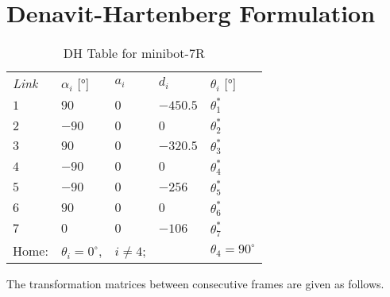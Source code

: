 \section{Denavit-Hartenberg Formulation}
\label{sec:dh}

{\renewcommand{\arraystretch}{1.2}
\begin{table}[t]
    \caption{DH Table for minibot-7R}
    \label{tab:dh}
    \centering
    \begin{tabular}{ *5l }           \toprule
      \emph{Link}  & \emph{$\alpha_i$} [\unit{\degree}]& \emph{$a_i$} & \emph{$d_i$}\; [\unit{\milli\meter}] & \emph{$\theta_i$} [\unit{\degree}]\\ 
      \cmidrule(lr){1-1} \cmidrule(lr){2-2} \cmidrule(lr){3-3} \cmidrule(lr){4-4} \cmidrule(lr){5-5}
      $1$ & $90$ & $0$ & $-450.5$ & $\theta_1^*$ \\
    $2$ & $-90$ & $0$ & $0$ & $\theta_2^*$ \\
    $3$ & $90$ & $0$  & $-320.5$ & $\theta_3^*$ \\
    $4$ & $-90$ & $0$ & $0$ & $\theta_4^*$ \\
    $5$ & $-90$ & $0$ & $-256$ & $\theta_5^*$ \\
    $6$ & $90$ & $0$ & $0$ & $\theta_6^*$ \\
    $7$ & $0$ & $0$ & $-106$ & $\theta_7^*$ \\ \midrule
    Home: & $\theta_i = 0^\circ$, & $i \neq 4$; & & $\theta_4 = 90^\circ$ \\
    \bottomrule
    \hline
    \end{tabular}
\end{table}
}

The transformation matrices between consecutive frames are given as follows.

